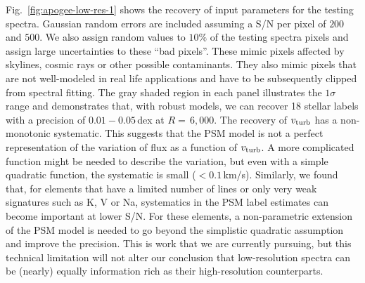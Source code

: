 \documentclass[iop]{emulateapj}
\begin{document}
\begin{CJK*}{UTF8}{gbsn}
Fig.~\ref{fig:apogee-low-res-1} shows the recovery of input parameters for the testing spectra. Gaussian random errors are included assuming a S/N per pixel of $200$ and $500$. We also assign random values to $10\%$ of the testing spectra pixels and assign large uncertainties to these ``bad pixels''. These mimic pixels affected by skylines, cosmic rays or other possible contaminants. They also mimic pixels that are not well-modeled in real life applications and have to be subsequently clipped from spectral fitting. The gray shaded region in each panel illustrates the $1\sigma$ range and demonstrates that, with robust models, we can recover 18 stellar labels with a precision of $0.01-0.05\,$dex at $R = \,$6$,$000. The recovery of $v_{\rm turb}$ has a non-monotonic systematic. This suggests that the PSM model is not a perfect representation of the variation of flux as a function of $v_{\rm turb}$. A more complicated function might be needed to describe the variation, but even with a simple quadratic function, the systematic is small ($< 0.1\,$km/s). Similarly, we found that, for elements that have a limited number of lines or only very weak signatures such as K, V or Na, systematics in the PSM label estimates can become important at lower S/N. For these elements, a non-parametric extension of the PSM model is needed to go beyond the simplistic quadratic assumption and improve the precision. This is work that we are currently pursuing, but this technical limitation will not alter our conclusion that low-resolution spectra can be (nearly) equally information rich as their high-resolution counterparts.


\end{CJK*}
\end{document}
